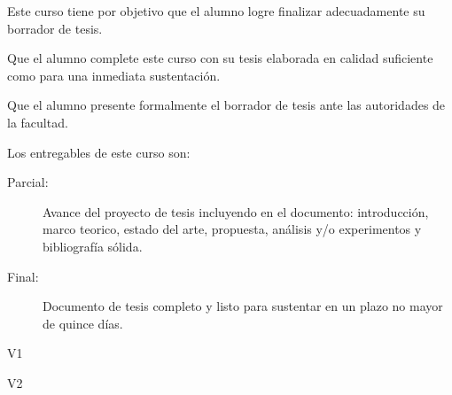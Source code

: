 \begin{syllabus}


\begin{justification}
Este curso tiene por objetivo que el alumno logre finalizar adecuadamente su borrador de tesis.
\end{justification}

\begin{goals}
\item Que el alumno complete este curso con su tesis elaborada en calidad suficiente como para una inmediata sustentación.
\item Que el alumno presente formalmente el borrador de tesis ante las autoridades de la facultad.
\item Los entregables de este curso son:
	\begin{description}
	\item [Parcial:] Avance del proyecto de tesis incluyendo en el documento: introducción, marco teorico, estado del arte, propuesta, análisis y/o experimentos y bibliografía sólida.
	\item [Final:] Documento de tesis completo y listo para sustentar en un plazo no mayor de quince días.
	\end{description}
\end{goals}

\begin{outcomes}{V1}
\item {}
\item {}
\item {}
\item {}
\item {}
\item {}
\item {}
\item {}
\end{outcomes}

\begin{outcomes}{V2}
\item {}
\item {}
\item {}
\item {}
\end{outcomes}


\end{syllabus}
